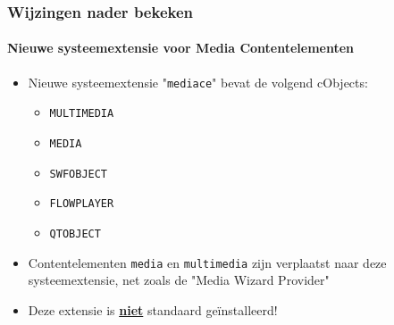 \begin{frame}[fragile]
	\frametitle{Wijzingen nader bekeken}
	\framesubtitle{Nieuwe systeemextensie voor Media Contentelementen}

	\begin{itemize}

		\item Nieuwe systeemextensie "\texttt{mediace}" bevat de volgend cObjects:

			\begin{itemize}
				\item \texttt{MULTIMEDIA}
				\item \texttt{MEDIA}
				\item \texttt{SWFOBJECT}
				\item \texttt{FLOWPLAYER}
				\item \texttt{QTOBJECT}
			\end{itemize}

		\item Contentelementen \texttt{media} en \texttt{multimedia} zijn verplaatst naar
			deze systeemextensie, net zoals de "Media Wizard Provider"

		\item Deze extensie is \underline{\textbf{niet}} standaard geïnstalleerd!

	\end{itemize}

\end{frame}


